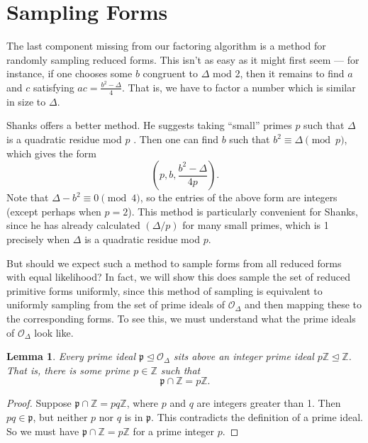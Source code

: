 \documentclass[honours,12pt]{unswthesis}
\newcommand{\Z}{\mathbb{Z}} %
\newcommand{\order}{\mathcal{O}} %
\newtheorem{lemma}[theorem]{Lemma}
\numberwithin{equation}{section}
\begin{document}
\pagebreak
\section{Sampling Forms} \label{s-sampling-forms}

The last component missing from our factoring algorithm is a method for randomly sampling reduced forms.
This isn't as easy as it might first seem --- 
for instance, if one chooses some $b$ congruent to $\Delta$ mod 2, then it remains to find $a$ and $c$ satisfying $ac = \frac{b^2 - \Delta}{4}$.
That is, we have to factor a number which is similar in size to $\Delta$.

Shanks offers a better method.
He suggests taking ``small'' primes $p$ such that $\Delta$ is a quadratic residue mod $p$ \cite[\S\,2]{shanks}.
Then one can find $b$ such that $b^2 \equiv \Delta \pmod{p}$, which gives the form
$$\left( p, b, \frac{b^2 - \Delta}{4p} \right).$$
Note that $\Delta - b^2 \equiv 0 \pmod{4}$, so the entries of the above form are integers (except perhaps when $p = 2$).
This method is particularly convenient for Shanks, since he has already calculated $(\Delta / p)$ for many small primes, which is 1 precisely when $\Delta$ is a quadratic residue mod $p$.

But should we expect such a method to sample forms from all reduced forms with equal likelihood?
In fact, we will show this does sample the set of reduced primitive forms uniformly, since this method of sampling is equivalent to uniformly sampling from the set of prime ideals of $\order_\Delta$ and then mapping these to the corresponding forms.
To see this, we must understand what the prime ideals of $\order_\Delta$ look like.

\vspace{2mm}
\begin{lemma}
    Every prime ideal $\mathfrak{p} \trianglelefteq \order_\Delta$ sits above an integer prime ideal $p\Z \trianglelefteq \Z$.
    That is, there is some prime $p \in \Z$ such that
    $$\mathfrak{p} \cap \Z = p\Z.$$
\end{lemma}

\begin{proof}
    Suppose $\mathfrak{p} \cap \Z = pq\Z$, where $p$ and $q$ are integers greater than 1.
    Then $pq \in \mathfrak{p}$, but neither $p$ nor $q$ is in $\mathfrak{p}$.
    This contradicts the definition of a prime ideal.
    So we must have $\mathfrak{p} \cap \Z = p\Z$ for a prime integer $p$.
\end{proof}
\end{document}
